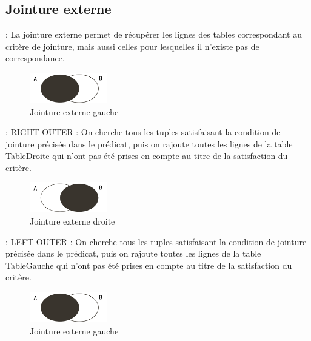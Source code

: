\documentclass[10pt]{beamer}
\begin{document}
\subsection{Jointure externe}
\begin{frame}{\secname : \subsecname}
    La jointure externe permet de récupérer les lignes des tables correspondant au critère de jointure, mais aussi celles pour lesquelles il n'existe pas de correspondance.
    
    \begin{figure}
        \begin{center}
            \includegraphics[width=0.3\textwidth]{../assets/img/left-join.pdf}
            \caption{Jointure externe gauche}
        \end{center}
    \end{figure}
\end{frame}
\begin{frame}{\secname : \subsecname}
    RIGHT OUTER : On cherche tous les tuples satisfaisant la condition de jointure précisée dans le prédicat, puis on rajoute toutes les lignes de la table TableDroite qui n'ont pas été prises en compte au titre de la satisfaction du critère.
    \begin{figure}
        \begin{center}
            \includegraphics[width=0.3\textwidth]{../assets/img/right-join.pdf}
            \caption{Jointure externe droite}
        \end{center}
    \end{figure}
\end{frame}
\begin{frame}{\secname : \subsecname}
    LEFT OUTER : On cherche tous les tuples satisfaisant la condition de jointure précisée dans le prédicat, puis on rajoute toutes les lignes de la table TableGauche qui n'ont pas été prises en compte au titre de la satisfaction du critère.
    \begin{figure}
        \begin{center}
            \includegraphics[width=0.3\textwidth]{../assets/img/left-join.pdf}
            \caption{Jointure externe gauche}
        \end{center}
    \end{figure}
\end{frame}
\end{document}
